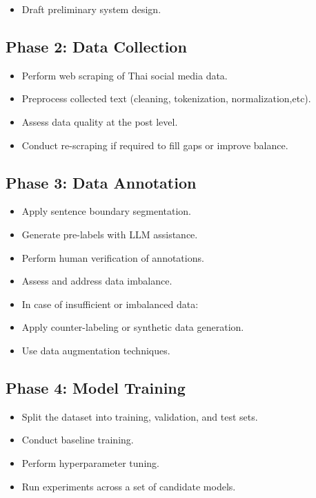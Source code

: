 \documentclass[12pt,oneside,openright,a4paper]{cpe-english-project}
\begin{document}
\begin{itemize}
\item
  {Draft preliminary system design.}
\end{itemize}

\subsection{Phase 2: Data Collection}

\begin{itemize}
\item
  {Perform web scraping of Thai social media data.}
\item
  {Preprocess collected text (cleaning, tokenization, normalization,etc).}
\item
  {Assess data quality at the post level.}
\item
  {Conduct re-scraping if required to fill gaps or improve balance.}
\end{itemize}

\subsection{Phase 3: Data Annotation}

\begin{itemize}
\item
  {Apply sentence boundary segmentation.}
\item
  {Generate pre-labels with LLM assistance.}
\item
  {Perform human verification of annotations.}
\item
  {Assess and address data imbalance.}
\item
  {In case of insufficient or imbalanced data:}
\end{itemize}

\begin{itemize}
\item
  {Apply counter-labeling or synthetic data generation.}
\item
  {Use data augmentation techniques.}
\end{itemize}

\subsection{Phase 4: Model Training}

\begin{itemize}
\item
  {Split the dataset into training, validation, and test sets.}
\item
  {Conduct baseline training.}
\item
  {Perform hyperparameter tuning.}
\item
  {Run experiments across a set of candidate models.}
\end{itemize}
\end{document}
